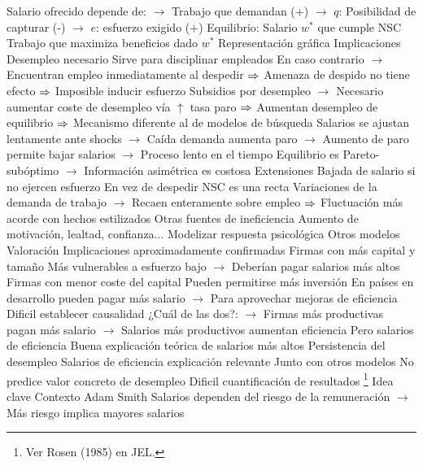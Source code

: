 \documentclass{nuevotema}
\begin{document}
\begin{esquemal}
				\4[] Salario ofrecido depende de:
				\4[] $\to$ Trabajo que demandan (+)
				\4[] $\to$ $q$: Posibilidad de capturar (-)
				\4[] $\to$ $e$: esfuerzo exigido (+)
				\4 Equilibrio:
				\4[] Salario $w^*$ que cumple NSC
				\4[] Trabajo que maximiza beneficios dado $w^*$
				\4 Representación gráfica
				\4[] 
			\3 Implicaciones
				\4 Desempleo necesario
				\4[] Sirve para disciplinar empleados
				\4[] En caso contrario
				\4[] $\to$ Encuentran empleo inmediatamente al despedir
				\4[] $\Rightarrow$ Amenaza de despido no tiene efecto
				\4[] $\Rightarrow$ Imposible inducir esfuerzo
				\4 Subsidios por desempleo
				\4[] $\to$ Necesario aumentar coste de desempleo vía $\uparrow$ tasa paro
				\4[] $\Rightarrow$ Aumentan desempleo de equilibrio
				\4[] $\Rightarrow$ Mecanismo diferente al de modelos de búsqueda
				\4 Salarios se ajustan lentamente ante shocks
				\4[] $\to$ Caída demanda aumenta paro
				\4[] $\to$ Aumento de paro permite bajar salarios
				\4[] $\to$ Proceso lento en el tiempo
				\4 Equilibrio es Pareto-subóptimo
				\4[] $\to$ Información asimétrica es costosa
		\2 Extensiones
			\3 Bajada de salario si no ejercen esfuerzo
				\4 En vez de despedir
				\4 NSC es una recta
				\4[] Variaciones de la demanda de trabajo
				\4[] $\to$ Recaen enteramente sobre empleo
				\4[] $\Rightarrow$ Fluctuación más acorde con hechos estilizados
			\3 Otras fuentes de ineficiencia
				\4 Aumento de motivación, lealtad, confianza...
				\4 Modelizar respuesta psicológica
				\4 Otros modelos
		\2 Valoración
			\3 Implicaciones aproximadamente confirmadas
				\4 Firmas con más capital y tamaño
				\4[] Más vulnerables a esfuerzo bajo
				\4[] $\to$ Deberían pagar salarios más altos
				\4 Firmas con menor coste del capital
				\4[] Pueden permitirse más inversión
				\4[] En países en desarrollo pueden pagar más salario
				\4[] $\to$ Para aprovechar mejoras de eficiencia
			\3 Dificil establecer causalidad
				\4 ¿Cuál de las dos?:
				\4[] $\to$ Firmas más productivas pagan más salario
				\4[] $\to$ Salarios más productivos aumentan eficiencia
				\4 Pero salarios de eficiencia
				\4[] Buena explicación teórica de salarios más altos
			\3 Persistencia del desempleo
				\4 Salarios de eficiencia explicación relevante
				\4[] Junto con otros modelos
				\4 No predice valor concreto de desempleo
				\4[] Dificil cuantificación de resultados
	\1 \footnote{Ver Rosen (1985) en JEL.}
		\2 Idea clave
			\3 Contexto
				\4 Adam Smith
				\4[] Salarios dependen del riesgo de la remuneración
				\4[] $\to$ Más riesgo implica mayores salarios

\end{esquemal}
\end{document}
